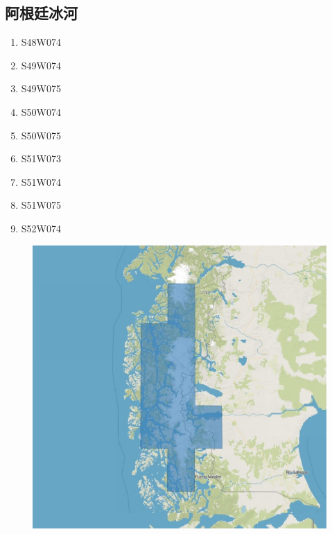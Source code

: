 \documentclass[a4paper, 12pt]{article}
\begin{document}
\begin{appendices}
    \subsection{阿根廷冰河}
    \begin{multicols}{3}
        \begin{enumerate}
            \item S48W074
            \item S49W074
            \item S49W075
            \item S50W074
            \item S50W075
            \item S51W073
            \item S51W074
            \item S51W075
            \item S52W074
        \end{enumerate}
    \end{multicols}
    \begin{figure}[H]
        \centering
        \includegraphics[width=0.8\linewidth]{fig/a4.jpg}
    \end{figure}

\end{appendices}
\end{document}
